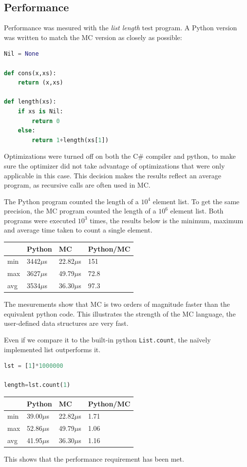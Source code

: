 \subsection{Performance}

Performance was mesured with the \textit{list length} test program.
A Python version was written to match the MC version as closely as possible:

\begin{lstlisting}[language=python]
Nil = None

def cons(x,xs):
    return (x,xs)

def length(xs):
    if xs is Nil:
        return 0
    else:
        return 1+length(xs[1])
\end{lstlisting}

Optimizations were turned off on both the C\# compiler and python, to make sure the optimizer did not take advantage of optimizations that were only applicable in this case.
This decision makes the results reflect an average program, as recursive calls are often used in MC.

The Python program counted the length of a $10^4$ element list.
To get the same precision, the MC program counted the length of a $10^6$ element list.
Both programs were executed $10^3$ times, the results below is the minimum, maximum and average time taken to count a single element.

\begin{tabular}{l|lll}
& Python & MC & Python/MC \\
\hline
min & 3442$\mu$s & 22.82$\mu$s & 151  \\
max & 3627$\mu$s & 49.79$\mu$s & 72.8 \\
avg & 3534$\mu$s & 36.30$\mu$s & 97.3 \\
\end{tabular}

The mesurements show that MC is two orders of magnitude faster than the equivalent python code.
This illustrates the strength of the MC language, the user-defined data structures are very fast.

Even if we compare it to the built-in python \texttt{List.count}, the naïvely implemented list outperforms it.

\begin{lstlisting}[language=python]
lst = [1]*1000000

length=lst.count(1)
\end{lstlisting}

\begin{tabular}{l|lll}
& Python & MC & Python/MC \\
\hline
min & 39.00$\mu$s & 22.82$\mu$s & 1.71 \\
max & 52.86$\mu$s & 49.79$\mu$s & 1.06 \\
avg & 41.95$\mu$s & 36.30$\mu$s & 1.16 \\
\end{tabular}

This shows that the performance requirement has been met. 
